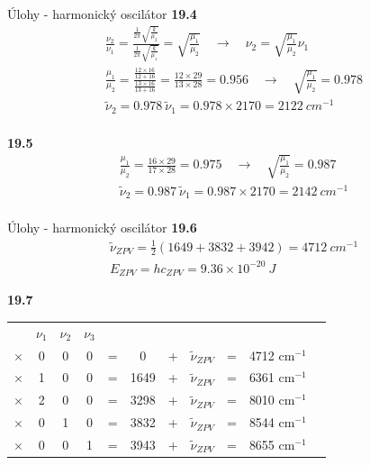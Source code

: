 \documentclass{beamer}
\begin{document}
\begin{frame}{Úlohy - harmonický oscilátor}
\textbf{19.4}
\begin{align*}
\frac{\nu_2}{\nu_1} = \frac{\frac{1}{2\pi}\sqrt{\frac{k}{\mu_2}}}{\frac{1}{2\pi}\sqrt{\frac{k}{\mu_1}}} = \sqrt{\frac{\mu_1}{\mu_2}} \quad \rightarrow \quad \nu_2=\sqrt{\frac{\mu_1}{\mu_2}} \nu_1\\
\frac{\mu_1}{\mu_2}=\frac{\frac{12\times16}{12+16}}{\frac{13\times16}{13+16}} = \frac{12\times 29}{13\times 28} = 0.956 \quad \rightarrow \quad \sqrt{\frac{\mu_1}{\mu_2}} = 0.978\\
\tilde{\nu}_2=0.978\:\tilde{\nu}_1=0.978\times2170=2122 \: cm^{-1}\\
\end{align*}

\textbf{19.5}
\begin{align*}
\frac{\mu_1}{\mu_2}= \frac{16\times 29}{17\times 28} = 0.975 \quad \rightarrow \quad \sqrt{\frac{\mu_1}{\mu_2}} = 0.987\\
\tilde{\nu}_2=0.987\:\tilde{\nu}_1=0.987\times2170=2142 \: cm^{-1}\\
\end{align*}
\end{frame}


\begin{frame}{Úlohy - harmonický oscilátor}
\textbf{19.6}
\begin{align*}
\tilde{\nu}_{ZPV}=\frac{1}{2}(1649+3832+3942)=4712\: cm^{-1}\\
E_{ZPV}=hc_{ZPV}=9.36\times 10^{-20} \:J
\end{align*}

\textbf{19.7}

\begin{tabular}{ccccccccccc}
&$\nu_1$&$\nu_2$&$\nu_3$\\
$\times$&0&0&0&=&0   &+&$\tilde{\nu}_{ZPV}$&=&4712 cm$^{-1}$ \\
$\times$&1&0&0&=&1649&+&$\tilde{\nu}_{ZPV}$&=&6361 cm$^{-1}$  \\
$\times$&2&0&0&=&3298&+&$\tilde{\nu}_{ZPV}$&=&8010 cm$^{-1}$  \\
$\times$&0&1&0&=&3832&+&$\tilde{\nu}_{ZPV}$&=&8544 cm$^{-1}$  \\
$\times$&0&0&1&=&3943&+&$\tilde{\nu}_{ZPV}$&=&8655 cm$^{-1}$
\end{tabular}
\end{frame}
\end{document}

